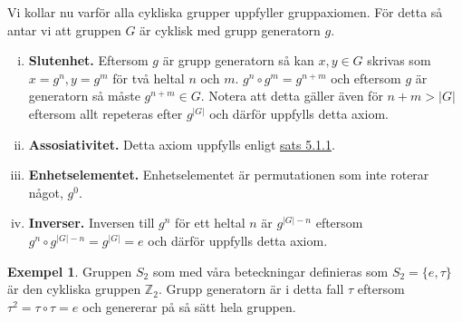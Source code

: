 \documentclass{article}
\theoremstyle{definition}
\newtheorem{exmp}[thm]{Exempel}
\begin{document}
Vi kollar nu varför alla cykliska grupper uppfyller gruppaxiomen. För detta så antar vi 
att gruppen $G$ är cyklisk med grupp generatorn $g$.
\begin{enumerate}[(i)]
  \item \textbf{Slutenhet.} Eftersom $g$ är grupp generatorn så kan 
  $x, y \in G$ skrivas som $x = g^n, y = g^m$ för två heltal $n$ och $m$. 
  $g^n \circ g^m = g^{n + m}$ och eftersom 
  $g$ är generatorn så måste $g^{n+m} \in G$. Notera att detta gäller även för $n+m > |G|$ eftersom 
  allt repeteras efter $g^{|G|}$ och därför uppfylls detta axiom.
  \item \textbf{Assosiativitet.} Detta axiom uppfylls enligt \hyperlink{ass}{sats 5.1.1}.
  \item \textbf{Enhetselementet.} Enhetselementet är permutationen som inte roterar något,
  $g^0.$
  \item \textbf{Inverser.} Inversen till $g^n$ för ett heltal $n$ är $g^{|G|-n}$ eftersom 
  $g^{n} \circ g^{|G|-n} = g^{|G|} = e$ och därför uppfylls detta axiom.
\end{enumerate}

\begin{exmp}
  Gruppen $S_2$ som med våra beteckningar definieras som $S_2 = \{e, \tau\}$ är 
  den cykliska gruppen $\mathbb{Z}_2$. Grupp generatorn är i detta fall 
  $\tau$ eftersom $\tau^2 = \tau \circ \tau = e$
  och genererar på så sätt hela gruppen.
\end{exmp}
\end{document}
